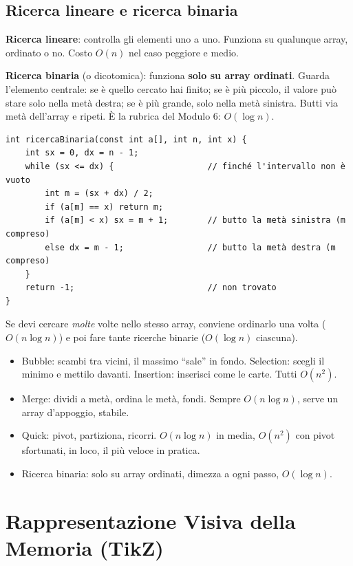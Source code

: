 \subsection*{Ricerca lineare e ricerca binaria}

\textbf{Ricerca lineare}: controlla gli elementi uno a uno. Funziona su qualunque
array, ordinato o no. Costo $O(n)$ nel caso peggiore e medio.

\textbf{Ricerca binaria} (o dicotomica): funziona \textbf{solo su array
ordinati}. Guarda l'elemento centrale: se è quello cercato hai finito; se è più
piccolo, il valore può stare solo nella metà destra; se è più grande, solo nella metà
sinistra. Butti via metà dell'array e ripeti. È la rubrica del Modulo 6: $O(\log n)$.

\begin{lstlisting}
int ricercaBinaria(const int a[], int n, int x) {
    int sx = 0, dx = n - 1;
    while (sx <= dx) {                   // finché l'intervallo non è vuoto
        int m = (sx + dx) / 2;
        if (a[m] == x) return m;
        if (a[m] < x) sx = m + 1;        // butto la metà sinistra (m compreso)
        else dx = m - 1;                 // butto la metà destra (m compreso)
    }
    return -1;                           // non trovato
}
\end{lstlisting}
Se devi cercare \emph{molte} volte nello stesso array, conviene ordinarlo una volta
($O(n \log n)$) e poi fare tante ricerche binarie ($O(\log n)$ ciascuna).

\begin{inparole}
\begin{itemize}
  \item Bubble: scambi tra vicini, il massimo ``sale'' in fondo. Selection: scegli il
        minimo e mettilo davanti. Insertion: inserisci come le carte.
        Tutti $O(n^2)$.
  \item Merge: dividi a metà, ordina le metà, fondi. Sempre $O(n \log n)$, serve un
        array d'appoggio, stabile.
  \item Quick: pivot, partiziona, ricorri. $O(n \log n)$ in media, $O(n^2)$ con pivot
        sfortunati, in loco, il più veloce in pratica.
  \item Ricerca binaria: solo su array ordinati, dimezza a ogni passo, $O(\log n)$.
\end{itemize}
\end{inparole}

\section{Rappresentazione Visiva della Memoria (TikZ)}

